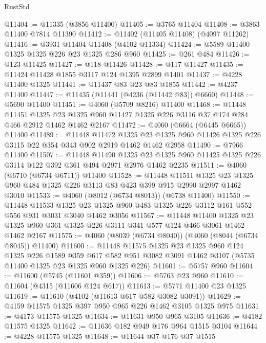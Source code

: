 \begin{lexlean}{RustStd}
\begin{coremodule}
@11404 := @11335 (@3856 @11400)
@11405 := @3765 @11404
@11408 := @3863 @11400 @7814 @11390
@11412 := @11402 (@11405 @11408) (@4097 @11262)
@11416 := @3931 @11404 @11408 (@4102 @11334)
@11424 := @5589 @11400 @1325 @1325 @226 @23 @1325 @286 @960
@11425 := @261 @484
@11426 := @123 @11425
@11427 := @118 @11426
@11428 := @117 @11427
@11435 := @11424 @11428 @1855 @3117 @124 @1395 @2899 @1401
@11437 := @4228 @11400 @1325
@11441 := @11437 @83 @23 @83 @1855
@11442 := @4237 @11400
@11447 := @11435 (@11441 (@4236 (@11442 @83)) @6660)
@11448 := @5690 @11400
@11451 := @4060 (@5709 @8216) @11400
@11468 := @11448
    @11451
    @1325
    @23
    @1325
    @960
    @11427
    @1325
    @226
    @3116
    @37
    @174
    @284
    @466
    @2912
    @1462
    @1462
    @2167
@11472 := @4060 (@6664 (@6445 @6665)) @11400
@11489 := @11448
    @11472
    @1325
    @23
    @1325
    @960
    @11426
    @1325
    @226
    @3115
    @22
    @354
    @343
    @902
    @2919
    @1462
    @1462
    @2958
@11490 := @7966 @11400
@11507 := @11448
    @11490
    @1325
    @23
    @1325
    @960
    @11425
    @1325
    @226
    @3114
    @122
    @392
    @361
    @494
    @2971
    @2976
    @1462
    @2235
@11511 := @4060 (@6710 (@6734 @6711)) @11400
@11528 := @11448
    @11511
    @1325
    @23
    @1325
    @960
    @484
    @1325
    @226
    @3113
    @83
    @423
    @399
    @915
    @2990
    @2997
    @1462
    @3010
@11533 := @4060 (@8012 (@6734 @8013)) (@6738 @11400)
@11550 := @11448
    @11533
    @1325
    @23
    @1325
    @960
    @483
    @1325
    @226
    @3112
    @161
    @552
    @556
    @931
    @3031
    @3040
    @1462
    @3056
@11567 := @11448
    @11400
    @1325
    @23
    @1325
    @960
    @361
    @1325
    @226
    @3111
    @341
    @577
    @124
    @466
    @3061
    @1462
    @1462
    @2167
@11575 := @4060 (@8039 (@6734 @8040)) (@4060 (@8044 (@6734 @8045)) @11400)
@11600 := @11448
    @11575
    @1325
    @23
    @1325
    @960
    @124
    @1325
    @226
    @1589
    @359
    @617
    @582
    @951
    @3082
    @3091
    @1462
    @3107
    (@5735 @11400 @1325 @23 @1325 @960 @1325 @226)
@11601 := @5757 @960
@11604 := @11600 (@5745 (@11601 @359))
@11606 := @5763 @23 @960
@11610 := @11604 (@4315 (@11606 @124 @617))
@11613 := @5771 @11400 @23 @1325
@11619 := @11610 (@4102 (@11613 @617 @582 @3082 @3091))
@11629 := @4159 @11575 @1325 @397 @950 @965 @226 @1462 @3105 @1325 @975
@11631 := @4173 @11575 @1325
@11634 := @11631 @950 @965 @3105
@11636 := @4182 @11575 @1325
@11642 := @11636 @182 @949 @176 @964 @1515 @3104
@11644 := @4228 @11575 @1325
@11648 := @11644 @37 @176 @37 @1515

\end{coremodule}
\end{lexlean}
